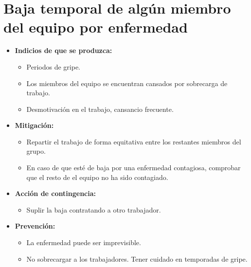 \documentclass[spanish,a4paper,12pt]{report}	%
\begin{document}
	\section{Baja temporal de algún miembro del equipo por enfermedad}
		\begin{itemize}
			\item \textbf {Indicios de que se produzca: }
				\begin{itemize}
				  \item  Periodos de gripe.
				  \item  Los miembros del equipo se encuentran cansados por sobrecarga de trabajo.
				  \item  Desmotivación en el trabajo, cansancio frecuente.
				\end{itemize} 
			\item \textbf {Mitigación: }
				\begin{itemize}
					\item Repartir el trabajo de forma equitativa entre los restantes miembros del grupo.
					\item En caso de que esté de baja por una enfermedad contagiosa, comprobar que el resto de el equipo no ha sido contagiado.
				\end{itemize} 
			\item \textbf {Acción de contingencia: }
				\begin{itemize}
					\item Suplir la baja contratando a otro trabajador.
				\end{itemize}
			\item \textbf {Prevención: }
				\begin{itemize}
				  \item La enfermedad puede ser imprevisible. 
				  \item No sobrecargar a los trabajadores. Tener cuidado en temporadas de gripe. 
				\end{itemize} 
			\end{itemize}
		
\end{document}
